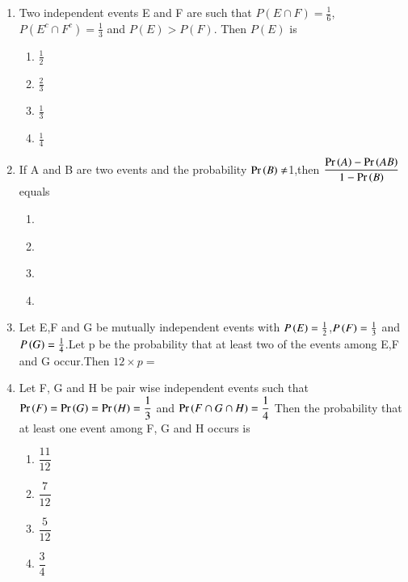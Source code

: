 \begin{enumerate}[label=\thesection.\arabic*.,ref=\thesection.\theenumi]
\\
\solution
  
%
\item Two independent events E and F are such that $P(E\cap F) = \displaystyle\frac{1}{6}$,$P(E^c\cap F^c)=\displaystyle\frac{1}{3}$ and $P(E)>P(F)$. Then $P(E)$ is
\begin{enumerate}[label=(\Alph*)]
    \item $\displaystyle\frac{1}{2}$\\
    \item $\displaystyle\frac{2}{3}$\\
    \item $\displaystyle\frac{1}{3}$\\
    \item $\displaystyle\frac{1}{4}$
\end{enumerate}
%
\solution
  
%
\item If A and B are two events and the 
probability $\Pr\left(B\right)\neq$1,then  
$\dfrac{\Pr\left(A\right)-\Pr\left(A B\right)}{1-\Pr\left(B\right)}$ equals \\
\begin{enumerate}
    \item {}\\
    \item {}\\
    \item {}\\
    \item {}\\
\end{enumerate}   
%
\solution
  
%
\item Let E,F and G be mutually independent events with $P\left(E\right)=\frac{1}{2}$,$P\left(F\right)=\frac{1}{3}$ and $P\left(G\right)=\frac{1}{4}$.Let p be the probability that at least two of the events among E,F and G occur.Then $12\times p=$
%
\solution
  

%
\item Let F, G and H be pair wise independent events such that $\Pr\left(F\right)=\Pr\left(G\right)=\Pr\left(H\right)=\dfrac{1}{3}$ 
and $\Pr\left(F \cap G \cap H\right)=\dfrac{1}{4}$ Then the probability that at least one event among F, G and H occurs is 
\begin{enumerate}

\setlength\itemsep{2em}
\item $\dfrac{11}{12}$
\item $\dfrac{7}{12}$
\item $\dfrac{5}{12}$
\item $\dfrac{3}{4}$

\end{enumerate}
%
\solution
  
  


\end{enumerate}